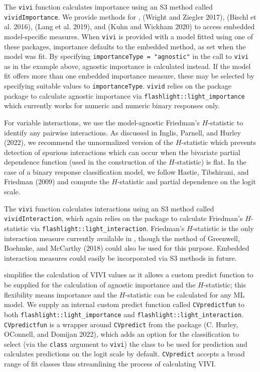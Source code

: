 The \texttt{vivi} function calculates importance using an S3 method called \texttt{vividImportance}. We provide methods for ,
 (Wright and Ziegler 2017),  (Bischl et al. 2016),  (Lang et al. 2019), and  (Kuhn and Wickham 2020) to access embedded model-specific measures. When \texttt{vivi} is provided with a model fitted using one of these packages, importance defaults to the embedded method, as set when the model was fit. By specifying \texttt{importanceType\ =\ "agnostic"} in the call to \texttt{vivi} as in the example above, agnostic importance is calculated instead. If the model fit offers more than one embedded importance measure, these may be selected by specifying suitable values to \texttt{importanceType}.
\texttt{vivid} relies on the package  package to calculate agnostic importance via \texttt{flashlight::light\_importance} which currently works for numeric and numeric binary responses only.

For variable interactions, we use the model-agnostic Friedman's \(H\)-statistic to identify any pairwise interactions. As discussed in Inglis, Parnell, and Hurley (2022), we recommend the unnormalized version of the \(H\)-statistic which prevents detection of spurious interactions which can occur when the bivariate partial dependence function (used in the construction of the \(H\)-statistic) is flat. In the case of a binary response classification model, we follow Hastie, Tibshirani, and Friedman (2009) and compute the \(H\)-statistic and partial dependence on the logit scale.

The \texttt{vivi} function calculates interactions using an S3 method called \texttt{vividInteraction}, which again relies on the  package to calculate Friedman's \(H\)-statistic via
\texttt{flashlight::light\_interaction}. Friedman's \(H\)-statistic is the only interaction measure currently available in , though the method of Greenwell, Boehmke, and McCarthy (2018) could also be used for this purpose. Embedded interaction measures could easily be incorporated via S3 methods in future.

 simplifies the calculation of VIVI values
as it allows a custom predict function to be supplied for the calculation of agnostic importance and the \(H\)-statistic; this flexibility means importance and the \(H\)-statistic can be calculated for any ML model.
We supply an internal custom predict function called \texttt{CVpredictfun} to both \texttt{flashlight::light\_importance} and \texttt{flashlight::light\_interaction}. \texttt{CVpredictfun} is a wrapper around \texttt{CVpredict} from the  package (C. Hurley, OConnell, and Domijan 2022), which adds an option for the classification to select (via the \texttt{class} argument to \texttt{vivi}) the class to be used for prediction and calculates predictions on the logit scale by default.
\texttt{CVpredict} accepts a broad range of fit classes thus streamlining the process of calculating VIVI.

